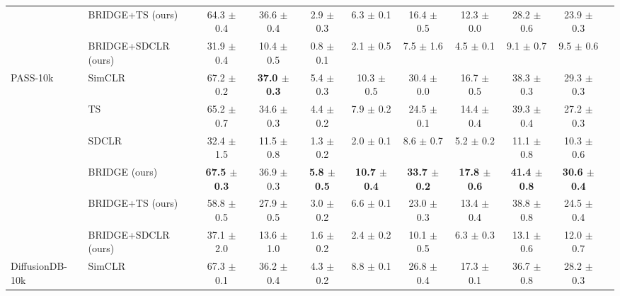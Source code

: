 \begin{table}[H]
\begin{adjustbox}{width=\textwidth}
\begin{tabular}{l l c c c c c c c c c}
 & BRIDGE+TS (ours) & 64.3 {\scriptsize$\pm$ 0.4} & 36.6 {\scriptsize$\pm$ 0.4} & 2.9 {\scriptsize$\pm$ 0.3} & 6.3 {\scriptsize$\pm$ 0.1} & 16.4 {\scriptsize$\pm$ 0.5} & 12.3 {\scriptsize$\pm$ 0.0} & 28.2 {\scriptsize$\pm$ 0.6} & 23.9 {\scriptsize$\pm$ 0.3} \\
 & BRIDGE+SDCLR (ours) & 31.9 {\scriptsize$\pm$ 0.4} & 10.4 {\scriptsize$\pm$ 0.5} & 0.8 {\scriptsize$\pm$ 0.1} & 2.1 {\scriptsize$\pm$ 0.5} & 7.5 {\scriptsize$\pm$ 1.6} & 4.5 {\scriptsize$\pm$ 0.1} & 9.1 {\scriptsize$\pm$ 0.7} & 9.5 {\scriptsize$\pm$ 0.6} \\
\midrule
PASS-10k & SimCLR & 67.2 {\scriptsize$\pm$ 0.2} & \textbf{37.0 {\scriptsize$\pm$ 0.3}} & 5.4 {\scriptsize$\pm$ 0.3} & 10.3 {\scriptsize$\pm$ 0.5} & 30.4 {\scriptsize$\pm$ 0.0} & 16.7 {\scriptsize$\pm$ 0.5} & 38.3 {\scriptsize$\pm$ 0.3} & 29.3 {\scriptsize$\pm$ 0.3} \\
 & TS & 65.2 {\scriptsize$\pm$ 0.7} & 34.6 {\scriptsize$\pm$ 0.3} & 4.4 {\scriptsize$\pm$ 0.2} & 7.9 {\scriptsize$\pm$ 0.2} & 24.5 {\scriptsize$\pm$ 0.1} & 14.4 {\scriptsize$\pm$ 0.4} & 39.3 {\scriptsize$\pm$ 0.4} & 27.2 {\scriptsize$\pm$ 0.3} \\
 & SDCLR & 32.4 {\scriptsize$\pm$ 1.5} & 11.5 {\scriptsize$\pm$ 0.8} & 1.3 {\scriptsize$\pm$ 0.2} & 2.0 {\scriptsize$\pm$ 0.1} & 8.6 {\scriptsize$\pm$ 0.7} & 5.2 {\scriptsize$\pm$ 0.2} & 11.1 {\scriptsize$\pm$ 0.8} & 10.3 {\scriptsize$\pm$ 0.6} \\
 & BRIDGE (ours) & \textbf{67.5 {\scriptsize$\pm$ 0.3}} & 36.9 {\scriptsize$\pm$ 0.3} & \textbf{5.8 {\scriptsize$\pm$ 0.5}} & \textbf{10.7 {\scriptsize$\pm$ 0.4}} & \textbf{33.7 {\scriptsize$\pm$ 0.2}} & \textbf{17.8 {\scriptsize$\pm$ 0.6}} & \textbf{41.4 {\scriptsize$\pm$ 0.8}} & \textbf{30.6 {\scriptsize$\pm$ 0.4}} \\
 & BRIDGE+TS (ours) & 58.8 {\scriptsize$\pm$ 0.5} & 27.9 {\scriptsize$\pm$ 0.5} & 3.0 {\scriptsize$\pm$ 0.2} & 6.6 {\scriptsize$\pm$ 0.1} & 23.0 {\scriptsize$\pm$ 0.3} & 13.4 {\scriptsize$\pm$ 0.4} & 38.8 {\scriptsize$\pm$ 0.8} & 24.5 {\scriptsize$\pm$ 0.4} \\
 & BRIDGE+SDCLR (ours) & 37.1 {\scriptsize$\pm$ 2.0} & 13.6 {\scriptsize$\pm$ 1.0} & 1.6 {\scriptsize$\pm$ 0.2} & 2.4 {\scriptsize$\pm$ 0.2} & 10.1 {\scriptsize$\pm$ 0.5} & 6.3 {\scriptsize$\pm$ 0.3} & 13.1 {\scriptsize$\pm$ 0.6} & 12.0 {\scriptsize$\pm$ 0.7} \\
\midrule
DiffusionDB-10k & SimCLR & 67.3 {\scriptsize$\pm$ 0.1} & 36.2 {\scriptsize$\pm$ 0.4} & 4.3 {\scriptsize$\pm$ 0.2} & 8.8 {\scriptsize$\pm$ 0.1} & 26.8 {\scriptsize$\pm$ 0.4} & 17.3 {\scriptsize$\pm$ 0.1} & 36.7 {\scriptsize$\pm$ 0.8} & 28.2 {\scriptsize$\pm$ 0.3} \\

\end{tabular}
\end{adjustbox}
\end{table}
